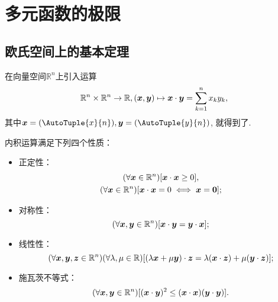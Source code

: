 \section{多元函数的极限}
\subsection{欧氏空间上的基本定理}
在向量空间\(\mathbb{R}^n\)上引入运算\[
	\mathbb{R}^n \times \mathbb{R}^n \to \mathbb{R},
	(\boldsymbol{x},\boldsymbol{y}) \mapsto \boldsymbol{x}\cdot\boldsymbol{y} = \sum_{k=1}^n x_k y_k,
\]
其中\(\vb{x}=(\AutoTuple{x}{n}),
\vb{y}=(\AutoTuple{y}{n})\),
就得到了.

内积运算满足下列四个性质：\begin{itemize}
	\item {\rm 正定性}：\begin{gather*}
		(\forall \boldsymbol{x}\in\mathbb{R}^n)
		[\boldsymbol{x}\cdot\boldsymbol{x}\geq0], \\
		(\forall \boldsymbol{x}\in\mathbb{R}^n)
		[\boldsymbol{x}\cdot\boldsymbol{x}=0 \iff \boldsymbol{x}=\boldsymbol0];
	\end{gather*}
	\item {\rm 对称性}：\begin{equation*}
		(\forall \boldsymbol{x},\boldsymbol{y}\in\mathbb{R}^n)
		[\boldsymbol{x}\cdot\boldsymbol{y} = \boldsymbol{y}\cdot\boldsymbol{x}];
	\end{equation*}
	\item {\rm 线性性}：\begin{equation*}
		(\forall \boldsymbol{x},\boldsymbol{y},\boldsymbol{z}\in\mathbb{R}^n)
		(\forall \lambda,\mu\in\mathbb{R})
		[(\lambda\boldsymbol{x}+\mu\boldsymbol{y})\cdot\boldsymbol{z} = \lambda(\boldsymbol{x}\cdot\boldsymbol{z}) + \mu(\boldsymbol{y}\cdot\boldsymbol{z})];
	\end{equation*}
	\item {\rm 施瓦茨不等式}：\begin{equation*}
		(\forall \boldsymbol{x},\boldsymbol{y}\in\mathbb{R}^n)
		[(\boldsymbol{x}\cdot\boldsymbol{y})^2 \leq (\boldsymbol{x}\cdot\boldsymbol{x})(\boldsymbol{y}\cdot\boldsymbol{y})].
	\end{equation*}
\end{itemize}

